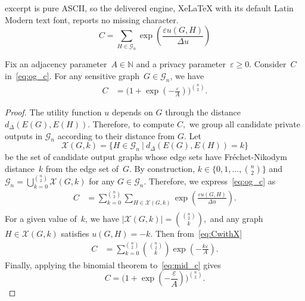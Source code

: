 \documentclass[10pt,a4paper]{amsart}
\newcommand{\FN}{Fr\'echet-Nikodym }
\newcommand{\G}{\mathcal{G}}
\newcommand{\uti}{d_\Delta}
\begin{document}
excerpt is pure ASCII, so the delivered engine, XeLaTeX with its default Latin Modern text font, reports no missing character.
\begin{equation}\label{eq:og_c}
C=\sum_{H\in\mathcal{G}_n}\exp\left(\frac{\varepsilon u(G,H)}{\Delta u}\right)
\end{equation}

\begin{lemma}\label{lem:norm_const}
Fix an adjacency parameter~$A \in \mathbb{N}$
and a privacy parameter~$\varepsilon \geq 0$.
Consider~$C$ in~\eqref{eq:og_c}. 
For any sensitive graph~$G\in\mathcal{G}_n$, we have 
\begin{equation}
\begin{aligned}\label{eq:big_C}
    C &= \biggl(1+\exp\left(-\frac{\varepsilon}{A}\right) \biggr)^{\binom{n}{2}}.
\end{aligned}
\end{equation}
\end{lemma}

\begin{proof}
    The utility function $u$ depends on $G$ through the distance~$\uti(E(G), E(H))$. 
Therefore, to compute $C,$ we group all candidate private outputs in $\mathcal{G}_n$ according to their distance from $G$.
Let
\begin{equation} \label{eq:X}
\mathcal{X}(G,k)=\{H\in \G_n \ | \ \uti(E(G),E(H))=k \}
\end{equation}
be the set of candidate output graphs whose edge sets have 
\FN distance~$k$ from the edge set of~$G$.
By construction, $k\in \{0, 1, \dots, \binom{n}{2}\}$ and~$\G_n = \bigcup_{k=0}^{\binom{n}{2}}\mathcal{X}(G,k)$ for any $G\in\mathcal{G}_n$. Therefore, we express~\eqref{eq:og_c} as
\begin{equation} \label{eq:CwithX}
\begin{aligned}
    C &= \sum_{k=0}^{\binom{n}{2}} \sum_{H\in \mathcal{X}(G,k)} \exp\left(\frac{\varepsilon u(G,H)}{\Delta u}\right). \\ 
\end{aligned}
\end{equation}
For a given value of~$k$, we have $|\mathcal{X}(G,k)|=\binom{\binom{n}{2}}{k},$ and any graph $H\in\mathcal{X}(G,k)$ satisfies $u(G,H)=-k$. 
Then from~\eqref{eq:CwithX} 
\begin{equation}
\begin{aligned}
    C &= \sum_{k=0}^{\binom{n}{2}} {\binom{\binom{n}{2}}{k}} \exp\left(-\frac{k\varepsilon}{A}\right).\label{eq:mid_c}
\end{aligned}
\end{equation}
Finally, applying the binomial theorem to~\eqref{eq:mid_c} gives $$
    C = \biggl(1+\exp\left(-\frac{\varepsilon}{A}\right) 
    \biggr)^{\binom{n}{2}}.$$ 
\end{proof}
\end{document}
